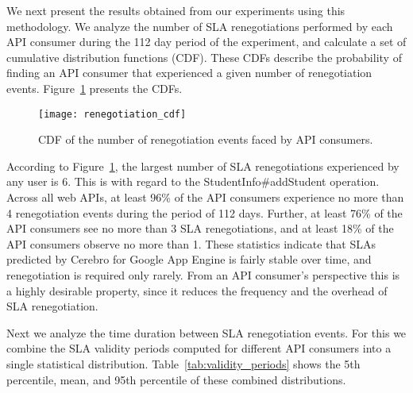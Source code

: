 We next present the results obtained from our experiments using this methodology. We
analyze the number of SLA renegotiations performed by each API consumer during the 112 day
period of the experiment, and calculate a set of cumulative distribution functions (CDF). These
CDFs describe the probability of finding an API consumer that experienced a given number of
renegotiation events. Figure~\ref{fig:renegotiation_cdf} presents the CDFs.

\begin{figure}
\centering
\texttt{[image: renegotiation\_cdf]}
\caption{CDF of the number of renegotiation events faced by API consumers.}
\label{fig:renegotiation_cdf}
\vspace{-0.1in}
\end{figure}

According to Figure~\ref{fig:renegotiation_cdf}, the largest number of SLA renegotiations 
experienced by any user is 6. This is
with regard to the StudentInfo\#addStudent operation. Across all web APIs, at least 96\% of the API
consumers experience no more than 4 renegotiation events during the period of 112 days. Further,
at least 76\% of the API consumers see no more than 3 SLA renegotiations, and at least 18\% of
the API consumers observe no more than 1. These statistics
indicate that SLAs predicted by Cerebro for Google App Engine is fairly
stable over time, and renegotiation is required only rarely. From an API consumer's perspective
this is a highly desirable property, since it reduces the frequency and the 
overhead of SLA renegotiation.

Next we analyze the time duration between SLA renegotiation events. For this we combine the SLA validity
periods computed for different API consumers into a single statistical distribution. 
Table~\ref{tab:validity_periods} shows the 5th percentile, mean, and 95th percentile 
of these combined distributions. 

